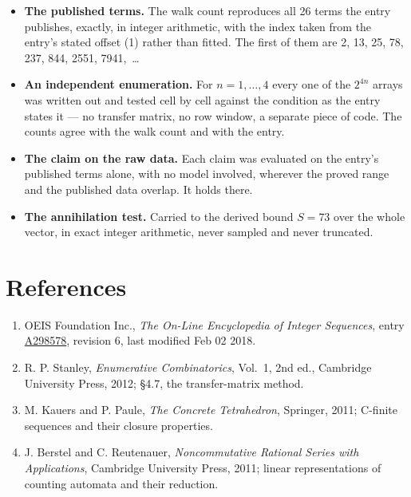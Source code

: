 \documentclass[11pt]{article}
\theoremstyle{definition}
\begin{document}
\begin{itemize}

\item {\bfseries The published terms.} The walk count reproduces all 26 terms the entry publishes, exactly, in integer arithmetic, with the index taken from the entry's stated offset (1) rather than fitted. The first of them are 2, 13, 25, 78, 237, 844, 2551, 7941,~\dots

\item {\bfseries An independent enumeration.} For $n = 1,\dots,4$ every one of the $2^{4n}$ arrays was written out and tested cell by cell against the condition as the entry states it --- no transfer matrix, no row window, a separate piece of code. The counts agree with the walk count and with the entry.

\item {\bfseries The claim on the raw data.} Each claim was evaluated on the entry's published terms alone, with no model involved, wherever the proved range and the published data overlap. It holds there.

\item {\bfseries The annihilation test.} Carried to the derived bound $S = 73$ over the whole vector, in exact integer arithmetic, never sampled and never truncated.

\end{itemize}

\section{References}

\begin{enumerate}

\item OEIS Foundation Inc., \emph{The On-Line Encyclopedia of Integer Sequences}, entry \href{https://oeis.org/A298578}{A298578}, revision 6, last modified Feb 02 2018.

\item R. P. Stanley, \emph{Enumerative Combinatorics}, Vol.~1, 2nd ed., Cambridge University Press, 2012; \S4.7, the transfer-matrix method.

\item M. Kauers and P. Paule, \emph{The Concrete Tetrahedron}, Springer, 2011; C-finite sequences and their closure properties.

\item J. Berstel and C. Reutenauer, \emph{Noncommutative Rational Series with Applications}, Cambridge University Press, 2011; linear representations of counting automata and their reduction.

\end{enumerate}
\end{document}
